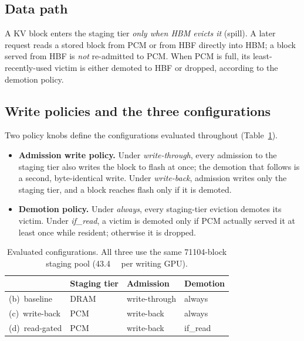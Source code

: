 \documentclass[conference]{IEEEtran}
\newcommand{\cfgb}{\textsf{(b)}}
\newcommand{\cfgc}{\textsf{(c)}}
\newcommand{\cfgd}{\textsf{(d)}}
\begin{document}
\subsection{Data path}
A KV block enters the staging tier \emph{only when HBM evicts it} (spill). A
later request reads a stored block from PCM or from HBF directly into HBM; a
block served from HBF is \emph{not} re-admitted to PCM. When PCM is full, its
least-recently-used victim is either demoted to HBF or dropped, according to
the demotion policy.

\subsection{Write policies and the three configurations}
Two policy knobs define the configurations evaluated throughout
(Table~\ref{tab:configs}).

\begin{itemize}
  \item \textbf{Admission write policy.} Under \emph{write-through}, every
        admission to the staging tier also writes the block to flash at once;
        the demotion that follows is a second, byte-identical write. Under
        \emph{write-back}, admission writes only the staging tier, and a block
        reaches flash only if it is demoted.
  \item \textbf{Demotion policy.} Under \emph{always}, every staging-tier
        eviction demotes its victim. Under \emph{if\_read}, a victim is demoted
        only if PCM actually served it at least once while resident; otherwise
        it is dropped.
\end{itemize}

\begin{table}[t]
\centering
\caption{Evaluated configurations. All three use the same
\num{71104}-block staging pool (\SI{43.4}{\gibi\byte} per writing GPU).}
\label{tab:configs}
\small
\begin{tabular}{llll}
\toprule
 & \textbf{Staging tier} & \textbf{Admission} & \textbf{Demotion} \\
\midrule
\cfgb\ baseline       & DRAM & write-through & always \\
\cfgc\ write-back     & PCM  & write-back    & always \\
\cfgd\ read-gated     & PCM  & write-back    & if\_read \\
\bottomrule
\end{tabular}
\end{table}
\end{document}
